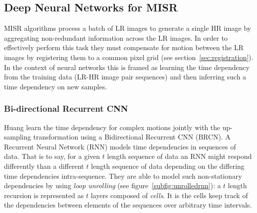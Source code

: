 \subsection{Deep Neural Networks for MISR}
MISR algorithms process a batch of LR images to generate a single HR image by aggregating non-redundant information across the LR images.
%
In order to effectively perform this task they must compensate for motion between the LR images by registering them to a common pixel grid (see section~\ref{sec:registration}).
%
In the context of neural networks this is framed as learning the time dependency from the training data (LR-HR image pair sequences) and then inferring such a time dependency on new samples.
%
\subsubsection{Bi-directional Recurrent CNN}

Huang \etal\cite{huang2015bidirectional} learn the time dependency for complex motions jointly with the up-sampling transformation using a Bidirectional Recurrent CNN (BRCN). 
%
A Recurrent Neural Network (RNN) models time dependencies in sequences of data.
%
That is to say, for a given \(t\) length sequence of data an RNN might respond differently than a different \(t\) length sequence of data depending on the differing time dependencies intra-sequence.
%
They are able to model such non-stationary dependencies by using \textit{loop unrolling} (see figure~\ref{subfig:unrolledrnn}): a \(t\) length recursion is represented as \(t\) layers composed of \textit{cells}.
%
It is the cells keep track of the dependencies between elements of the sequences over arbitrary time intervals.
%
%

